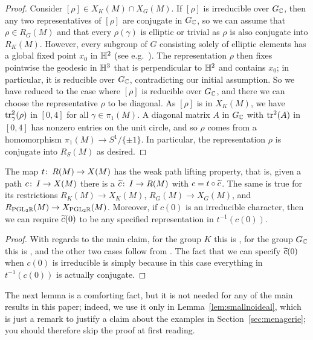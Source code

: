 \documentclass[tikz, sepfignums, defaultenums]{nmd/article}
\newcommand{\G}{G}
\newcommand{\RG}[1]{\mathit{R}_{G}\left(#1\right)}
\newcommand{\XG}[1]{\mathit{X}_{G}\left(#1\right)}
\newcommand{\GC}{G_\C}
\begin{document}
\begin{proof}
Consider $[\rho] \in X_K(M) \cap \XG{M}$.  If $[\rho]$ is irreducible
over $\GC$, then any two representatives of $[\rho]$ are conjugate in
$\GC$, so we can assume that $\rho \in \RG{M}$ and that every
$\rho(\gamma)$ is elliptic or trivial as $\rho$ is also conjugate into
$R_K(M)$.  However, every subgroup of $\G$ consisting solely of
elliptic elements has a global fixed point $x_0$ in ${\mathbb{H}}^2$ (see
e.g.~\cite[Theorem~4.3.7]{Beardon1983}). The representation $\rho$
then fixes pointwise the geodesic in ${\mathbb{H}}^3$ that is perpendicular to
${\mathbb{H}}^2$ and contains $x_0$; in particular, it is reducible over $\GC$,
contradicting our initial assumption.  So we have reduced to the case
where $[\rho]$ is reducible over $\GC$, and there we can choose the
representative $\rho$ to be diagonal.  As $[\rho]$ is in $X_K(M)$, we
have $\operatorname{tr}_\gamma^2(\rho)$ in $[0, 4]$ for all $\gamma \in \pi_1(M)$.
A diagonal matrix $A$ in $\GC$ with $\operatorname{tr}^2(A)$ in $[0, 4]$ has nonzero
entries on the unit circle, and so $\rho$ comes from a homomorphism
$\pi_1(M) \to S^1/\{\pm 1\}$.  In particular, the representation
$\rho$ is conjugate into $R_S(M)$ as desired.
\end{proof}

\begin{lemma}\label{lem:pathlift}
  The map $t \colon\thinspace R(M) \to X(M)$ has the weak path lifting property,
  that is, given a path $c \colon\thinspace I \to X(M)$ there is a $\ctil \maps I
  \to R(M)$ with $c = t \circ \ctil$.  The same is true for its
  restrictions $R_K(M) \to X_K(M)$, $\RG{M} \to \XG{M}$, and
  $R_{\mathrm{PGL}_{2} {\mathbb R}}(M) \to  X_{\mathrm{PGL}_{2} {\mathbb R}}(M)$.   Moreover, if $c(0)$
  is an irreducible character, then we can require $\ctil(0)$ to be
  any specified representation in $t^{-1}\left(c(0)\right)$.   
\end{lemma}

\begin{proof}
With regards to the main claim, for the group $K$ this is
\cite[Section II.6]{Bredon1972}, for the group $\GC$ this is
\cite[Corollary 3.3]{KraftPetrieRandall1989}, and the other two cases
follow from \cite[Lemma 2.1]{BiswasLawtonRamras2015}.  The fact that
we can specify $\ctil(0)$ when $c(0)$ is irreducible is simply because
in this case everything in $t^{-1}\left(c(0)\right)$ is actually
conjugate.
\end{proof}

The next lemma is a comforting fact, but it is not needed for any of
the main results in this paper; indeed, we use it only in
Lemma~\ref{lem:smallnoideal}, which is just a remark to justify a claim
about the examples in Section~\ref{sec:menagerie}; you should
therefore skip the proof at first reading.
\end{document}
